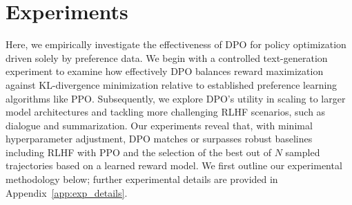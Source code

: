 \section{Experiments}
Here, we empirically investigate the effectiveness of DPO for policy optimization driven solely by preference data. We begin with a controlled text-generation experiment to examine how effectively DPO balances reward maximization against KL-divergence minimization relative to established preference learning algorithms like PPO. Subsequently, we explore DPO’s utility in scaling to larger model architectures and tackling more challenging RLHF scenarios, such as dialogue and summarization. Our experiments reveal that, with minimal hyperparameter adjustment, DPO matches or surpasses robust baselines including RLHF with PPO and the selection of the best out of $N$ sampled trajectories based on a learned reward model. We first outline our experimental methodology below; further experimental details are provided in Appendix~\ref{app:exp_details}.

